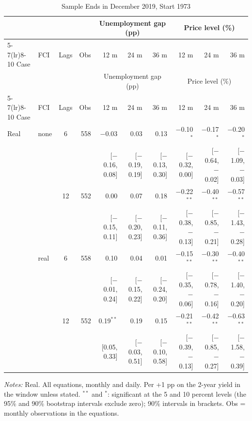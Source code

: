 \begingroup\scriptsize\setlength{\tabcolsep}{0.9pt}
\begin{longtable}{llcrrrrrrr}
\caption{Sample Ends in December 2019, Start 1973}\label{tab:appA173}\\
\toprule
 & & & & \multicolumn{3}{c}{Unemployment gap (pp)} & \multicolumn{3}{c}{Price level (\%)}\\ \cmidrule(lr){5-7}\cmidrule(lr){8-10}
Case & FCI & Lags & Obs & 12 m & 24 m & 36 m & 12 m & 24 m & 36 m\\
\midrule\endfirsthead
\toprule
 & & & & \multicolumn{3}{c}{Unemployment gap (pp)} & \multicolumn{3}{c}{Price level (\%)}\\ \cmidrule(lr){5-7}\cmidrule(lr){8-10}
Case & FCI & Lags & Obs & 12 m & 24 m & 36 m & 12 m & 24 m & 36 m\\
\midrule\endhead
\bottomrule\endfoot
Real & none & 6 & 558 & $-$0.03 & 0.03 & 0.13 & $-$0.10$^{*}$ & $-$0.17$^{*}$ & $-$0.20$^{*}$\\
 & & & & {\scriptsize [$-$0.16, 0.08]} & {\scriptsize [$-$0.19, 0.19]} & {\scriptsize [$-$0.13, 0.30]} & {\scriptsize [$-$0.32, 0.00]} & {\scriptsize [$-$0.64, $-$0.02]} & {\scriptsize [$-$1.09, $-$0.03]}\\
 &  & 12 & 552 & 0.00 & 0.07 & 0.18 & $-$0.22$^{**}$ & $-$0.40$^{**}$ & $-$0.57$^{**}$\\
 & & & & {\scriptsize [$-$0.15, 0.11]} & {\scriptsize [$-$0.20, 0.23]} & {\scriptsize [$-$0.11, 0.36]} & {\scriptsize [$-$0.38, $-$0.13]} & {\scriptsize [$-$0.85, $-$0.21]} & {\scriptsize [$-$1.43, $-$0.28]}\\
 & real & 6 & 558 & 0.10 & 0.04 & 0.01 & $-$0.15$^{**}$ & $-$0.30$^{**}$ & $-$0.40$^{**}$\\
 & & & & {\scriptsize [$-$0.01, 0.24]} & {\scriptsize [$-$0.15, 0.22]} & {\scriptsize [$-$0.24, 0.20]} & {\scriptsize [$-$0.35, $-$0.06]} & {\scriptsize [$-$0.78, $-$0.16]} & {\scriptsize [$-$1.40, $-$0.20]}\\
 &  & 12 & 552 & 0.19$^{**}$ & 0.19 & 0.15 & $-$0.21$^{**}$ & $-$0.42$^{**}$ & $-$0.63$^{**}$\\
 & & & & {\scriptsize [0.05, 0.33]} & {\scriptsize [$-$0.03, 0.51]} & {\scriptsize [$-$0.10, 0.58]} & {\scriptsize [$-$0.39, $-$0.13]} & {\scriptsize [$-$0.85, $-$0.27]} & {\scriptsize [$-$1.58, $-$0.39]}\\
\end{longtable}
\begin{flushleft}\footnotesize\textit{Notes:} Real. All equations, monthly and daily. Per +1 pp on the 2-year yield in the window unless stated. $^{**}$ and $^{*}$: significant at the 5 and 10 percent levels (the 95\% and 90\% bootstrap intervals exclude zero); 90\% intervals in brackets. Obs = monthly observations in the equations.\end{flushleft}
\endgroup
